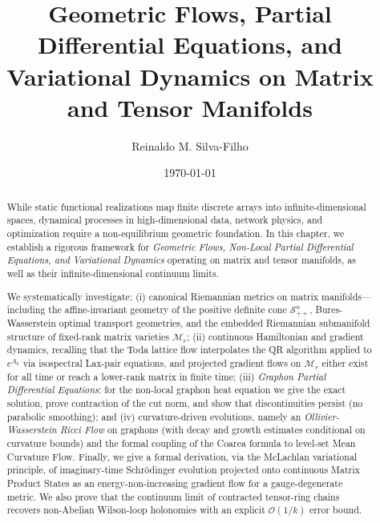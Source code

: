 \documentclass[11pt,a4paper,reqno]{amsart}
\title[Geometric Flows on Matrix and Tensor Manifolds]{Geometric Flows, Partial Differential Equations, and Variational Dynamics on Matrix and Tensor Manifolds}
\author{Reinaldo M. Silva-Filho}
\date{\today}
\theoremstyle{definition}
\numberwithin{equation}{section}
\begin{document}
\begin{abstract}
While static functional realizations map finite discrete arrays into infinite-dimensional spaces, dynamical processes in high-dimensional data, network physics, and optimization require a non-equilibrium geometric foundation. In this chapter, we establish a rigorous framework for \emph{Geometric Flows, Non-Local Partial Differential Equations, and Variational Dynamics} operating on matrix and tensor manifolds, as well as their infinite-dimensional continuum limits. 

We systematically investigate: (i) canonical Riemannian metrics on matrix manifolds---including the affine-invariant geometry of the positive definite cone $\mathcal{S}_{++}^n$, Bures-Wasserstein optimal transport geometries, and the embedded Riemannian submanifold structure of fixed-rank matrix varieties $\mathcal{M}_r$; (ii) continuous Hamiltonian and gradient dynamics, recalling that the Toda lattice flow interpolates the QR algorithm applied to $e^{A_0}$ via isospectral Lax-pair equations, and projected gradient flows on $\mathcal{M}_r$ either exist for all time or reach a lower-rank matrix in finite time; (iii) \emph{Graphon Partial Differential Equations}: for the non-local graphon heat equation we give the exact solution, prove contraction of the cut norm, and show that discontinuities persist (no parabolic smoothing); and (iv) curvature-driven evolutions, namely an \emph{Ollivier-Wasserstein Ricci Flow} on graphons (with decay and growth estimates conditional on curvature bounds) and the formal coupling of the Coarea formula to level-set Mean Curvature Flow. Finally, we give a formal derivation, via the McLachlan variational principle, of imaginary-time Schr\"odinger evolution projected onto continuous Matrix Product States as an energy-non-increasing gradient flow for a gauge-degenerate metric. We also prove that the continuum limit of contracted tensor-ring chains recovers non-Abelian Wilson-loop holonomies with an explicit $\mathcal{O}(1/k)$ error bound.
\end{abstract}


\maketitle
\end{document}

